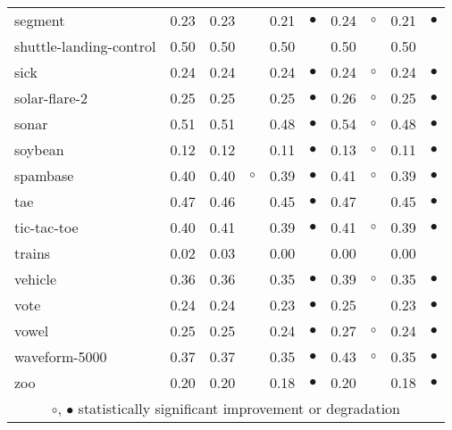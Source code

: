 {\begin{longtable}{lrr@{\hspace{0.1cm}}cr@{\hspace{0.1cm}}cr@{\hspace{0.1cm}}cr@{\hspace{0.1cm}}c}
segment & 0.23 & 0.23 &           & 0.21 & $\bullet$ & 0.24 &   $\circ$ & 0.21 & $\bullet$\\
shuttle-landing-control & 0.50 & 0.50 &           & 0.50 &           & 0.50 &           & 0.50 &          \\
sick & 0.24 & 0.24 &           & 0.24 & $\bullet$ & 0.24 &   $\circ$ & 0.24 & $\bullet$\\
solar-flare-2 & 0.25 & 0.25 &           & 0.25 & $\bullet$ & 0.26 &   $\circ$ & 0.25 & $\bullet$\\
sonar & 0.51 & 0.51 &           & 0.48 & $\bullet$ & 0.54 &   $\circ$ & 0.48 & $\bullet$\\
soybean & 0.12 & 0.12 &           & 0.11 & $\bullet$ & 0.13 &   $\circ$ & 0.11 & $\bullet$\\
spambase & 0.40 & 0.40 &   $\circ$ & 0.39 & $\bullet$ & 0.41 &   $\circ$ & 0.39 & $\bullet$\\
tae & 0.47 & 0.46 &           & 0.45 & $\bullet$ & 0.47 &           & 0.45 & $\bullet$\\
tic-tac-toe & 0.40 & 0.41 &           & 0.39 & $\bullet$ & 0.41 &   $\circ$ & 0.39 & $\bullet$\\
trains & 0.02 & 0.03 &           & 0.00 &           & 0.00 &           & 0.00 &          \\
vehicle & 0.36 & 0.36 &           & 0.35 & $\bullet$ & 0.39 &   $\circ$ & 0.35 & $\bullet$\\
vote & 0.24 & 0.24 &           & 0.23 & $\bullet$ & 0.25 &           & 0.23 & $\bullet$\\
vowel & 0.25 & 0.25 &           & 0.24 & $\bullet$ & 0.27 &   $\circ$ & 0.24 & $\bullet$\\
waveform-5000 & 0.37 & 0.37 &           & 0.35 & $\bullet$ & 0.43 &   $\circ$ & 0.35 & $\bullet$\\
zoo & 0.20 & 0.20 &           & 0.18 & $\bullet$ & 0.20 &           & 0.18 & $\bullet$\\
\hline
\multicolumn{10}{c}{$\circ$, $\bullet$ statistically significant improvement or degradation}\\
\end{longtable} \footnotesize \par}